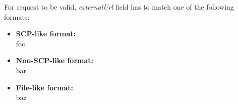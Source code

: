 \documentclass[../main.tex]{subfiles}
\begin{document}
For request to be valid, \textit{externalUrl} field has to match one of the following formats:

\begin{itemize}
    \item \textbf{SCP-like format:}\\
    foo

    \item \textbf{Non-SCP-like format:}\\
    bar

    \item \textbf{File-like format:}\\
    baz
\end{itemize}

\end{document}
